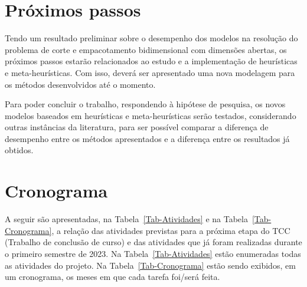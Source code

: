 \documentclass[10pt, a4paper]{article}
\newcommand{\Cor}{\cellcolor[HTML]{E5E5E5}}
\begin{document}
    \newpage
    \section{Próximos passos}
        Tendo um resultado preliminar sobre o desempenho dos modelos na resolução do problema de corte e empacotamento bidimensional com dimensões abertas, os próximos passos estarão relacionados ao estudo e a implementação de heurísticas e meta-heurísticas. Com isso, deverá ser apresentado uma nova modelagem para os métodos desenvolvidos até o momento.
        
        Para poder concluir o trabalho, respondendo à hipótese de pesquisa, os novos modelos baseados em heurísticas e meta-heurísticas serão testados, considerando outras instâncias da literatura, para ser possível comparar a diferença de desempenho entre os métodos apresentados e a diferença entre os resultados já obtidos.

        
    \section{Cronograma}
        A seguir são apresentadas, na Tabela~\ref{Tab-Atividades} e na Tabela~\ref{Tab-Cronograma}, a relação das atividades previstas para a próxima etapa do TCC (Trabalho de conclusão de curso) e das atividades que já foram realizadas durante o primeiro semestre de 2023. Na Tabela~\ref{Tab-Atividades} estão enumeradas todas as atividades do projeto. Na Tabela~\ref{Tab-Cronograma} estão sendo exibidos, em um cronograma, os meses em que cada tarefa foi/será feita. 
    
        \newcommand{\Cgr}{\cellcolor[HTML]{BEBEBE}}
        
\end{document}
